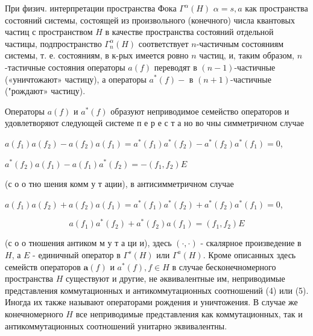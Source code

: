 \documentclass[10pt]{article}
\begin{document}
При физич. интерпретации пространства Фока $\Gamma^{\alpha}(H)$ $\alpha=s, a$ как пространства состояний системы, состоящей из произвольного (конечного) числа квантовых частиц с пространством $H$ в качестве пространства состояний отдельной частицы, подпространство $\Gamma_{n}^{\alpha}(H)$ соответствует $n$-частичным состояниям системы, т. е. состояниям, в к-рых имеется ровно $n$ частиц, и, таким образом, $n$-тастичные состояния операторы $a(f)$ переводят в $(n-1)$-частичные («уничтожают» частицу), а операторы $a^{*}(f)-$ в $(n+1)$-частичные ("рождают» частицу).



Операторы $a(f)$ и $a^{*}(f)$ образуют неприводимое семейство операторов и удовлетворяют следующей системе п е р е с т а но во чны симметричном случае



$a\left(f_{1}\right) a\left(f_{2}\right)-a\left(f_{2}\right) a\left(f_{1}\right)=a^{*}\left(f_{1}\right) a^{*}\left(f_{2}\right)-a^{*}\left(f_{2}\right) a^{*}\left(f_{1}\right)=0$,



$a^{*}\left(f_{2}\right) a\left(f_{1}\right)-a\left(f_{1}\right) a^{*}\left(f_{2}\right)=-\left(f_{1}, f_{2}\right) E$



(с о о тно шения комм у т ации), в антисимметричном случае



$a\left(f_{1}\right) a\left(f_{2}\right)+a\left(f_{2}\right) a\left(f_{1}\right)=a^{*}\left(f_{1}\right) a^{*}\left(f_{2}\right)+a^{*}\left(f_{2}\right) a^{*}\left(f_{1}\right)=0$,



\[

a\left(f_{1}\right) a^{*}\left(f_{2}\right)+a^{*}\left(f_{2}\right) a\left(f_{1}\right)=\left(f_{1}, f_{2}\right) E

\]



(с о о тношения антиком м у т а ци и), здесь $(\cdot, \cdot)$ - скалярное произведение в $H$, а $E$ - единичный оператор в $\Gamma^{s}(H)$ или $\Gamma^{a}(H)$. Кроме описанных здесь семейств операторов $\boldsymbol{a}(f)$ и $a^{*}(f), f \in H$ в случае бесконечномерного пространства $H$ существуют и другие, не әквивалентные им, неприводимые представления коммутационных и антикоммутационных соотношений (4) или (5). Иногда их также называют операторами рождения и уничтожения. В случае же конечномерного $H$ все неприводимые представления как коммутационных, так и антикоммутационных соотношений унитарно эквивалентны.
\end{document}
